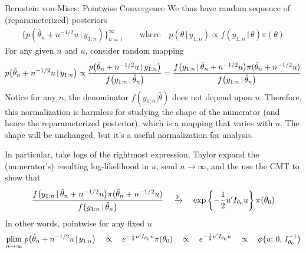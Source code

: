 \documentclass[aspectratio=169, handout]{beamer}
\newcommand{\ra}{\rightarrow}
\newcommand{\pto}{\xrightarrow{p}}
\begin{document}
{\scriptsize
\begin{frame}{Bernstein von-Mises: Pointwise Convergence}
We thus have random sequence of (reparameterized) posteriors
\begin{align*}
  \big\{p(\hat{\theta}_n+n^{-1/2}u\,|\,y_{1:n})\big\}_{n=1}^\infty
  \qquad \text{where}\quad
  p(\theta\,|\,y_{1:n})
  \propto
  f(y_{1:n}\,|\,\theta)
  \pi(\theta)
\end{align*}
For any given $n$ and $u$, consider random mapping
\begin{align*}
  p\big(\hat{\theta}_n+n^{-1/2}u\,|\,y_{1:n}\big)
  \propto
  \frac{%
    p\big(\hat{\theta}_n+n^{-1/2}u\,|\,y_{1:n}\big)
  }{%
    f\big(y_{1:n}\,|\,\hat{\theta}_n\big)
  }
  =
  \frac{%
    f\big(y_{1:n}\,|\,\hat{\theta}_n+n^{-1/2}u\big)
    \pi(\hat{\theta}_n+n^{-1/2}u)
  }{%
    f\big(y_{1:n}\,|\,\hat{\theta}_n\big)
  }
\end{align*}
Notice for any $n$, the denominator $f(y_{1:n}|\hat{\theta})$ does
\alert{not} depend upon $u$.
Therefore, this normalization is harmless for studying the \alert{shape}
of the numerator (and hence the reparameterized posterior), which is a
mapping that varies with $u$.
The shape will be unchanged, but it's a useful normalization for
analysis.

In particular, take logs of the rightmost expression, Taylor
expand the (numerator's) resulting log-likelihood in $u$, send
$n\ra\infty$, and the use the CMT to show that
\begin{align*}
  \frac{%
    f\big(y_{1:n}\,|\,\hat{\theta}_n+n^{-1/2}u\big)
    \pi(\hat{\theta}_n+n^{-1/2}u)
  }{%
    f\big(y_{1:n}\,|\,\hat{\theta}_n\big)
  }
  \quad
  \pto
  \quad
  \exp\left\{
    -\frac{1}{2}u'I_{\theta_0}u
  \right\}
  \pi(\theta_0)
\end{align*}
In other words, pointwise for any fixed $u$
\begin{align*}
  \underset{n\ra\infty}{\text{plim}}
  \;
  p\big(\hat{\theta}_n+n^{-1/2}u\,|\,y_{1:n}\big)
  \quad
  \propto
  \quad
  e^{%
    -\frac{1}{2}u'I_{\theta_0}u
  }
  \pi(\theta_0)
  \quad
  \propto
  \quad
  e^{%
    -\frac{1}{2}u'I_{\theta_0}u
  }
  \quad
  \propto
  \quad
  \phi\big(u;\,0,\,I_{\theta_0}^{-1}\big)
\end{align*}
\end{frame}
}
\end{document}
